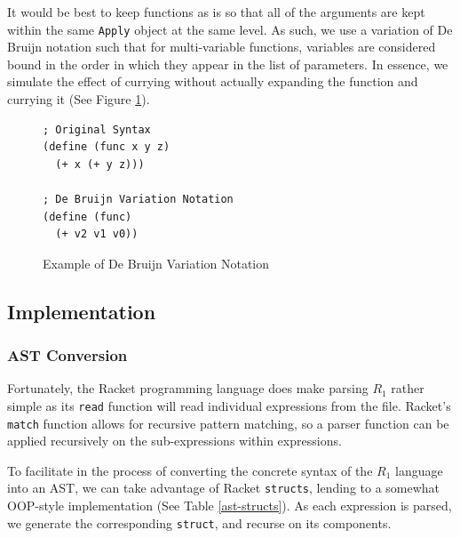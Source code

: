\documentclass[12pt]{article}
\newcommand{\R}{\ensuremath{\mathit{R_{1}}}}
\newcommand{\key}[1]{\texttt{#1}}
\begin{document}
It would be best to keep functions as is so that all of the arguments are kept within the same \key{Apply} object at the same level. As such, we use a variation of De Bruijn notation such that for multi-variable functions, variables are considered bound in the order in which they appear in the list of parameters. In essence, we simulate the effect of currying without actually expanding the function and currying it (See Figure \ref{debruijn-variation}).

\begin{figure}[H]
  \begin{mdframed}
    \begin{lstlisting}[escapechar=\%]
; Original Syntax
(define (func x y z)
  (+ x (+ y z)))

; De Bruijn Variation Notation
(define (func)
  (+ v2 v1 v0))
    \end{lstlisting}
  \end{mdframed}
  \caption{Example of De Bruijn Variation Notation}
  \label{debruijn-variation}
\end{figure}

\subsection{Implementation}
\subsubsection{AST Conversion}
Fortunately, the Racket programming language does make parsing \R{} rather simple as its \key{read} function will read individual expressions from the file. Racket's \key{match} function allows for recursive pattern matching, so a parser function can be applied recursively on the sub-expressions within expressions.

\hfill

To facilitate in the process of converting the concrete syntax of the \R{} language into an AST, we can take advantage of Racket \key{structs}, lending to a somewhat OOP-style implementation (See Table \ref{ast-structs}). As each expression is parsed, we generate the corresponding \key{struct}, and recurse on its components.
\end{document}
